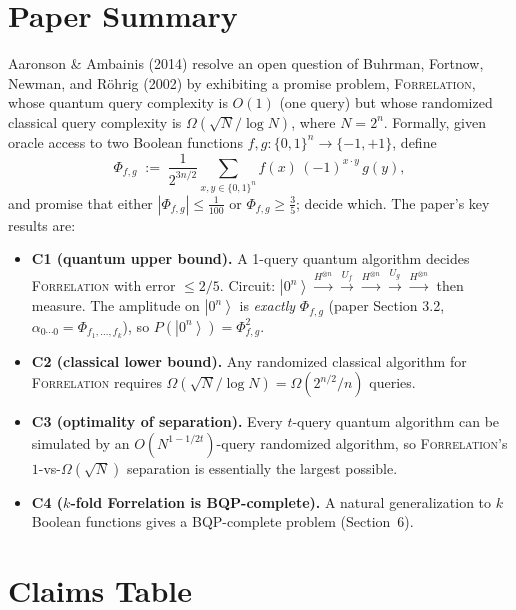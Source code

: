 \documentclass[11pt]{article}
\newcommand{\ket}[1]{\left|#1\right\rangle}
\begin{document}
\section{Paper Summary}
Aaronson \& Ambainis (2014) resolve an open question of Buhrman, Fortnow,
Newman, and R\"ohrig (2002) by exhibiting a promise problem, \textsc{Forrelation},
whose quantum query complexity is $O(1)$ (one query) but whose randomized
classical query complexity is $\Omega(\sqrt{N}/\log N)$, where $N = 2^n$.
Formally, given oracle access to two Boolean functions
$f, g : \{0,1\}^n \to \{-1, +1\}$, define
\begin{equation}
  \Phi_{f,g} \;:=\; \frac{1}{2^{3n/2}} \sum_{x, y \in \{0,1\}^n} f(x)\,(-1)^{x \cdot y}\,g(y),
  \label{eq:Phi}
\end{equation}
and promise that either $|\Phi_{f,g}| \le \tfrac{1}{100}$ or $\Phi_{f,g} \ge \tfrac{3}{5}$;
decide which. The paper's key results are:
\begin{itemize}
  \item \textbf{C1 (quantum upper bound).} A 1-query quantum algorithm decides
        \textsc{Forrelation} with error $\le 2/5$. Circuit:
        $\ket{0^n} \xrightarrow{H^{\otimes n}} \xrightarrow{U_f} \xrightarrow{H^{\otimes n}} \xrightarrow{U_g} \xrightarrow{H^{\otimes n}}$
        then measure. The amplitude on $\ket{0^n}$ is \emph{exactly} $\Phi_{f,g}$
        (paper Section 3.2, $\alpha_{0\cdots 0} = \Phi_{f_1,\ldots,f_k}$), so
        $P(\ket{0^n}) = \Phi_{f,g}^2$.
  \item \textbf{C2 (classical lower bound).} Any randomized classical
        algorithm for \textsc{Forrelation} requires
        $\Omega(\sqrt{N}/\log N) = \Omega(2^{n/2}/n)$ queries.
  \item \textbf{C3 (optimality of separation).} Every $t$-query quantum
        algorithm can be simulated by an $O(N^{1-1/2t})$-query randomized
        algorithm, so \textsc{Forrelation}'s $1$-vs-$\Omega(\sqrt{N})$ separation
        is essentially the largest possible.
  \item \textbf{C4 ($k$-fold Forrelation is BQP-complete).} A natural
        generalization to $k$ Boolean functions gives a BQP-complete problem
        (Section~6).
\end{itemize}

\section{Claims Table}
\end{document}
